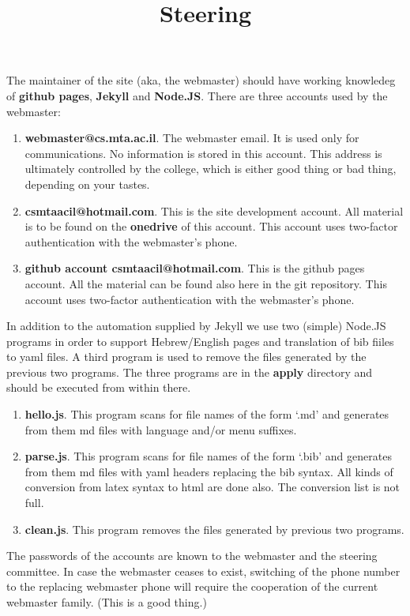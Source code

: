 \documentclass{article}
\title{Steering}
\begin{document}
\maketitle
The maintainer of the site (aka, the webmaster) should have working knowledeg of
	{\bf github pages}, {\bf Jekyll} and {\bf Node.JS}.
There are three accounts used by the webmaster:
\begin{enumerate}
\item
	{\bf webmaster@cs.mta.ac.il}.
	The webmaster email.
	It is used only for communications.
	No information is stored in this account.
	This address is ultimately controlled by the college, which is either good thing or bad thing,
		depending on your tastes.
\item
	{\bf csmtaacil@hotmail.com}.
	This is the site development account.
	All material is to be found on the {\bf onedrive} of this account.
	This account uses two-factor authentication with the webmaster's phone.
\item
	{\bf github account csmtaacil@hotmail.com}.
	This is the github pages account.
	All the material can be found also here in the git repository.
	This account uses two-factor authentication with the webmaster's phone.
\end{enumerate}
In addition to the automation supplied by Jekyll we use two (simple) Node.JS programs in order
to support  Hebrew/English pages and translation of bib fiiles to yaml files.
A third program is used to remove the files generated by the previous two programs.
The three programs are in the {\bf \textunderscore apply} directory and should be executed
	from within there.
\begin{enumerate}
\item {\bf hello.js}.
	This program scans for file names of the form `\textunderscore *.md' and generates
		from them md files with language and/or menu suffixes.
\item
	{\bf parse.js}.
	This program scans for file names of the form `\textunderscore *.bib' and generates
		from them md files with yaml headers replacing the bib syntax.
		All kinds of conversion from latex syntax to html are done also.
		The conversion list is not full.
\item
	{\bf clean.js}.
	This program removes the files generated by previous two programs.
\end{enumerate}
The passwords of the accounts are known to the webmaster and the steering committee.
In case the webmaster ceases to exist, switching of the phone number to the replacing 
	webmaster phone will require the cooperation of the current webmaster family.
	(This is a good thing.)
\end{document}
